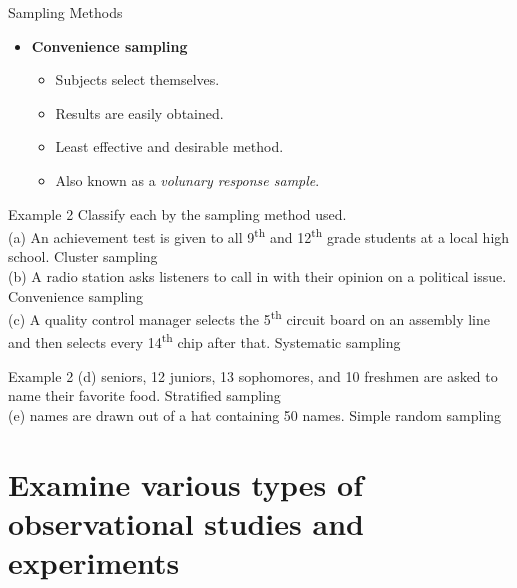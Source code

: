 \documentclass[t]{beamer}
\begin{document}
\begin{frame}{Sampling Methods}
\begin{itemize}
	\item<+-> \textbf{Convenience sampling}
	\begin{itemize}
		\item<+-> Subjects select themselves.
		\item<+-> Results are easily obtained.
		\item<+-> Least effective and desirable method.
		\item<+-> Also known as a \textit{volunary response sample}.
	\end{itemize}
\end{itemize}
\end{frame}

\begin{frame}{Example 2}
Classify each by the sampling method used.	\newline\\
(a) \quad An achievement test is given to all 9\textsuperscript{th} and 12\textsuperscript{th} grade students at a local high school.	\quad	\pause
\alert{Cluster sampling} \newline\\	\pause
(b) \quad A radio station asks listeners to call in with their opinion on a political issue.	\quad	\pause
\alert{Convenience sampling} \newline\\ \pause
(c) \quad A quality control manager selects the 5\textsuperscript{th} circuit board on an assembly line and then selects every 14\textsuperscript{th} chip after that.	\quad	\pause
\alert{Systematic sampling} 
\end{frame}

\begin{frame}{Example 2}
(d)  seniors, 12 juniors, 13 sophomores, and 10 freshmen are asked to name their favorite food. \quad \pause
\alert{Stratified sampling} \newline\\ \pause
(e)  names are drawn out of a hat containing 50 names. \quad \pause
\alert{Simple random sampling}
\end{frame}

\section{Examine various types of observational studies and experiments}
\end{document}
